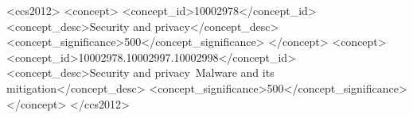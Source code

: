 \documentclass[sigconf, anonymous]{acmart}
\begin{document}
\begin{abstract}

\end{abstract}

\begin{CCSXML}
<ccs2012>
<concept>
<concept_id>10002978</concept_id>
<concept_desc>Security and privacy</concept_desc>
<concept_significance>500</concept_significance>
</concept>
<concept>
<concept_id>10002978.10002997.10002998</concept_id>
<concept_desc>Security and privacy~Malware and its mitigation</concept_desc>
<concept_significance>500</concept_significance>
</concept>
</ccs2012>
\end{CCSXML}



\maketitle




\end{document}
